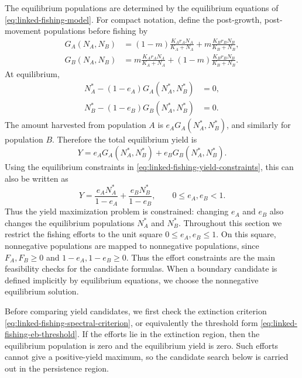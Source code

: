 \documentclass{article}
\numberwithin{equation}{section}
\begin{document}
The equilibrium populations are
determined by the equilibrium equations of
\eqref{eq:linked-fishing-model}. For compact notation, define the
post-growth, post-movement populations before fishing by
\begin{equation}
    \label{eq:linked-fishing-growth-before-harvest}
    \begin{aligned}
        G_A(N_A,N_B)
            &=
            (1-m)\frac{K_A r_A N_A}{K_A+N_A}
            +m\frac{K_B r_B N_B}{K_B+N_B},\\
        G_B(N_A,N_B)
            &=
            m\frac{K_A r_A N_A}{K_A+N_A}
            +(1-m)\frac{K_B r_B N_B}{K_B+N_B}.
    \end{aligned}
\end{equation}
At equilibrium,
\begin{equation}
    \label{eq:linked-fishing-yield-constraints}
    \begin{aligned}
        N_A^*-(1-e_A)G_A(N_A^*,N_B^*) &= 0,\\
        N_B^*-(1-e_B)G_B(N_A^*,N_B^*) &= 0.
    \end{aligned}
\end{equation}
The amount harvested from population $A$ is $e_A G_A(N_A^*,N_B^*)$,
and similarly for population $B$. Therefore the total equilibrium yield
is
\begin{equation*}
    Y=e_A G_A(N_A^*,N_B^*)+e_B G_B(N_A^*,N_B^*).
\end{equation*}
Using the equilibrium constraints in
\eqref{eq:linked-fishing-yield-constraints}, this can also be written as
\begin{equation}
    \label{eq:linked-fishing-yield}
    Y
    =
    \frac{e_A N_A^*}{1-e_A}
    +
    \frac{e_B N_B^*}{1-e_B},
    \qquad
    0\leq e_A,e_B<1.
\end{equation}
Thus the yield maximization problem is constrained: changing $e_A$ and
$e_B$ also changes the equilibrium populations $N_A^*$ and $N_B^*$.
Throughout this section we restrict the fishing efforts to the unit
square $0\leq e_A,e_B\leq1$. On this square, nonnegative populations are
mapped to nonnegative populations, since $F_A,F_B\geq0$ and
$1-e_A,1-e_B\geq0$. Thus the effort constraints are the main feasibility
checks for the candidate formulas. When a boundary candidate is defined
implicitly by equilibrium equations, we choose the nonnegative
equilibrium solution.

Before comparing yield candidates, we first check the extinction
criterion \eqref{eq:linked-fishing-spectral-criterion}, or equivalently
the threshold form \eqref{eq:linked-fishing-eb-threshold}. If the
efforts lie in the extinction region, then the equilibrium population is
zero and the equilibrium yield is zero. Such efforts cannot give a
positive-yield maximum, so the candidate search below is carried out in
the persistence region.
\end{document}
